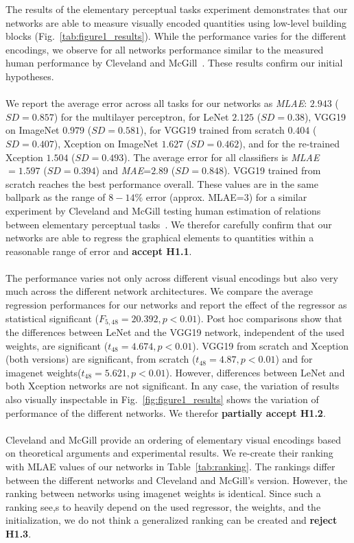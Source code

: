 The results of the elementary perceptual tasks experiment demonstrates that our networks are able to measure visually encoded quantities using low-level building blocks (Fig.~\ref{tab:figure1_results}). While the performance varies for the different encodings, we observe for all networks performance similar to the measured human performance by Cleveland and McGill~\cite{cleveland1985graphical}. These results confirm our initial hypotheses.
\\~\\
 We report the average error across all tasks for our networks as \textit{MLAE}: 
$2.943$ ($SD=0.857$) for the multilayer perceptron, 
for LeNet $2.125$ ($SD=0.38$), 
VGG19 on ImageNet $0.979$ ($SD=0.581$), 
for VGG19 trained from scratch $0.404$ ($SD=0.407$), 
Xception on ImageNet $1.627$ ($SD=0.462$), 
and for the re-trained Xception $1.504$ ($SD=0.493$). The average error for all classifiers is \textit{MLAE}$=1.597$ ($SD=0.394$) and \textit{MAE}=$2.89$ ($SD=0.848$). VGG19 trained from scratch reaches the best performance overall.
These values are in the same ballpark as the range of $8-14\%$ error (approx. MLAE=$3$) for a similar experiment by Cleveland and McGill testing human estimation of relations between elementary perceptual tasks~\cite{cleveland1985graphical}. We therefor carefully confirm that our networks are able to regress the graphical elements to quantities within a reasonable range of error and \textbf{accept H1.1}.
\\~\\
 The performance varies not only across different visual encodings but also very much across the different network architectures. We compare the average regression performances for our networks and report the effect of the regressor as statistical significant ($F_{5,48}=20.392,p<0.01$). Post hoc comparisons show that the differences between LeNet and the VGG19 network, independent of the used weights, are significant ($t_48=4.674,p<0.01$). VGG19 from scratch and Xception (both versions) are significant, from scratch ($t_48=4.87,p<0.01$) and for imagenet weights($t_48=5.621,p<0.01$). However, differences between LeNet and both Xception networks are not significant. In any case, the variation of results also visually inspectable in Fig.~\ref{fig:figure1_results} shows the variation of performance of the different networks. We therefor \textbf{partially accept H1.2}.
\\~\\
 Cleveland and McGill provide an ordering of elementary visual encodings based on theoretical arguments and experimental results. We re-create their ranking with MLAE values of our networks in Table~\ref{tab:ranking}. The rankings differ between the different networks and Cleveland and McGill's version. However, the ranking between networks using imagenet weights is identical. Since such a ranking see,s to heavily depend on the used regressor, the weights, and the initialization, we do not think a generalized ranking can be created and \textbf{reject H1.3}.

